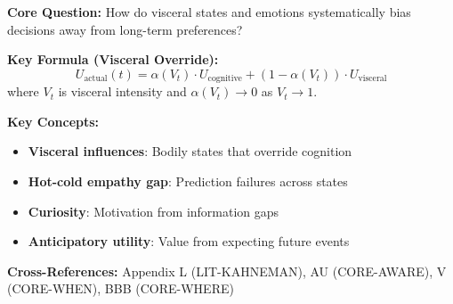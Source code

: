 \begin{tcolorbox}[colback=blue!5!white, colframe=blue!75!black,
    title=Quick Reference: LIT-LOEWENSTEIN]

\textbf{Core Question:} How do visceral states and emotions systematically bias decisions away from long-term preferences?

\textbf{Key Formula (Visceral Override):}
\begin{equation}
U_{\text{actual}}(t) = \alpha(V_t) \cdot U_{\text{cognitive}} + (1-\alpha(V_t)) \cdot U_{\text{visceral}}
\end{equation}
where $V_t$ is visceral intensity and $\alpha(V_t) \to 0$ as $V_t \to 1$.

\textbf{Key Concepts:}
\begin{itemize}[nosep]
\item \textbf{Visceral influences}: Bodily states that override cognition
\item \textbf{Hot-cold empathy gap}: Prediction failures across states
\item \textbf{Curiosity}: Motivation from information gaps
\item \textbf{Anticipatory utility}: Value from expecting future events
\end{itemize}

\textbf{Cross-References:} Appendix L (LIT-KAHNEMAN), AU (CORE-AWARE), V (CORE-WHEN), BBB (CORE-WHERE)
\end{tcolorbox}


